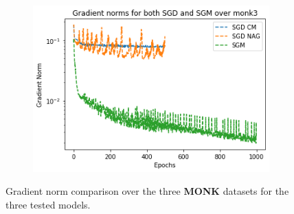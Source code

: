 \begin{figure}[H]
\begin{subfigure}{.45\textwidth}
{            \includegraphics[width=\linewidth]{res/grad_monk3.png}\hspace*{2.5em}%
        }
	\end{subfigure}
	
	\caption{Gradient norm comparison over the three \textbf{MONK} datasets for the three tested models.}
	\label{fig:monk_grad}
\end{figure}

